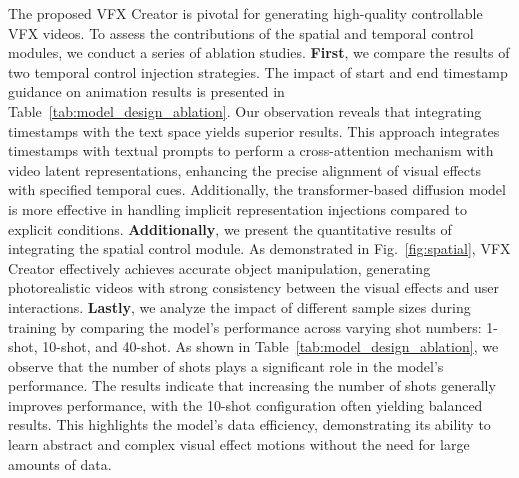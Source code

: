 The proposed VFX Creator is pivotal for generating high-quality controllable VFX videos. To assess the contributions of the spatial and temporal control modules, we conduct a series of ablation studies. \textbf{First}, we compare the results of two temporal control injection strategies. The impact of start and end timestamp guidance on animation results is presented in Table~\ref{tab:model_design_ablation}. Our observation reveals that integrating timestamps with the text space yields superior results. This approach integrates timestamps with textual prompts to perform a cross-attention mechanism with video latent representations, enhancing the precise alignment of visual effects with specified temporal cues. Additionally, the transformer-based diffusion model is more effective in handling implicit representation injections compared to explicit conditions. \textbf{Additionally}, we present the quantitative results of integrating the spatial control module. As demonstrated in Fig.~\ref{fig:spatial}, VFX Creator effectively achieves accurate object manipulation, generating photorealistic videos with strong consistency between the visual effects and user interactions. \textbf{Lastly}, we analyze the impact of different sample sizes during training by comparing the model's performance across varying shot numbers: 1-shot, 10-shot, and 40-shot. As shown in Table~\ref{tab:model_design_ablation}, we observe that the number of shots plays a significant role in the model's performance. The results indicate that increasing the number of shots generally improves performance, with the 10-shot configuration often yielding balanced results. This highlights the model's data efficiency, demonstrating its ability to learn abstract and complex visual effect motions without the need for large amounts of data.

\begin{table}[h]
\centering
\caption{Ablation results of two temporal control integration strategies.}
\renewcommand{\arraystretch}{1} %
\label{tab:timestamps_two_strategy}
\end{table}

